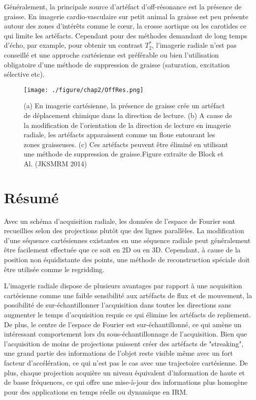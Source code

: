 Généralement, la principale source d'artéfact d'off-résonance est la présence de graisse. En imagerie cardio-vasculaire sur petit animal la graisse est peu présente autour des zones d'intérêts comme le cœur, la crosse aortique ou les carotides ce qui limite les artéfacts. Cependant pour des méthodes demandant de long temps d'écho, par example, pour obtenir un contrast $T_2^*$, l'imagerie radiale n'est pas conseillé et une approche cartésienne est préférable ou bien l'utilisation obligatoire d'une méthode de suppression de graisse (saturation, excitation sélective etc).
\begin{figure}[H]
\centering
\texttt{[image: ./figure/chap2/OffRes.png]}
\caption[Artéfact d'Off-résonance]{\label{fig:OffRes}  
(a) En imagerie cartésienne, la présence de graisse crée un artéfact de déplacement chimique dans la direction de lecture. (b) A cause de la modification de l'orientation de la direction de lecture en imagerie radiale, les artéfacts apparaissent comme un floue entourant les zones graisseuses. (c) Ces artéfacts peuvent être éliminé en utilisant une méthode de suppression de graisse.Figure extraite de Block et Al. (JKSMRM 2014)}
\end{figure}

\section{Résumé}

Avec un schéma d'acquisition radiale, les données de l'espace de Fourier sont recueillies selon des projections plutôt que des lignes parallèles. La modification d'une séquence cartésiennes existantes en une séquence radiale peut généralement être facilement effectuée que ce soit en 2D ou en 3D. Cependant, à cause de la position non équidistante des points, une méthode de reconstruction spéciale doit être utilisée comme le regridding.

L'imagerie radiale dispose de plusieurs avantages par rapport à une acquisition cartésienne comme une faible sensibilité aux artéfacts de flux et de mouvement, la possibilité de sur-échantillonner l'acquisition dans toutes les directions sans augmenter le temps d'acquisition requis ce qui élimine les artéfacts de repliement. De plus, le centre de l'espace de Fourier est sur-échantillonné, ce qui amène un intéressant comportement lors du sous-échantillonnage de l'acquisition. Bien que l'acquisition de moins de projections puissent créer des artéfacts de "streaking", une grand partie des informations de l'objet reste visible même avec un fort facteur d'accélération, ce qui n'est pas le cas avec une trajectoire cartésienne. De plus, chaque projection acquière un niveau équivalent d'information de haute et de basse fréquences, ce qui offre une mise-à-jour des informations plus homogène pour des applications en temps réelle ou dynamique en IRM.

